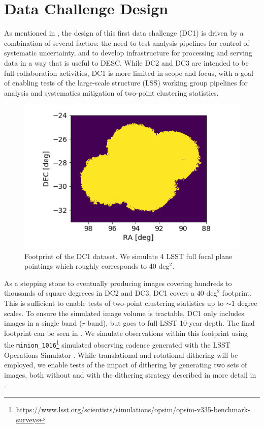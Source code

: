\documentclass[twocolumn]{aastex62}
\begin{document}
\section{Data Challenge Design}
\label{sec:design}

As mentioned in , the design of this first data challenge (DC1) is driven by a
combination of several factors: the need to test analysis pipelines for control of systematic
uncertainty, and to develop infrastructure for processing and serving data in a way that is useful
to DESC.  While DC2 and DC3 are intended to be full-collaboration activities, DC1 is more limited in
scope and focus, with a goal of enabling tests of the large-scale structure (LSS) working group
pipelines for analysis and systematics mitigation of two-point clustering statistics.

\begin{figure}
\centering
\includegraphics[width=0.9\columnwidth]{footprint.png}
\caption{Footprint of the DC1 dataset. We simulate 4 LSST full focal plane pointings which roughly corresponds to 40 deg$^{2}$.}
\label{fig:footprint}
\end{figure}

As a stepping stone to eventually producing images covering hundreds to thousands of square degreees
in DC2 and DC3, DC1 covers a $40$ deg$^2$ footprint.  This is sufficient to enable tests of
two-point clustering statistics up to $\sim 1$ degree scales.  To ensure the simulated image volume is
tractable, DC1 only includes images in a single band ($r$-band), but goes to full LSST 10-year
depth. The final footprint can be seen in .  We simulate observations within this
footprint using the
\texttt{minion\_1016}\footnote{\url{https://www.lsst.org/scientists/simulations/opsim/opsim-v335-benchmark-surveys}}
simulated observing cadence generated with the LSST Operations Simulator
\citep[OpSim;][]{2014SPIE.9150E..15D}.  While translational and rotational dithering will be employed,
we enable tests of the impact of dithering by generating two sets of images, both without and with
the dithering strategy described in more detail in .
\end{document}
